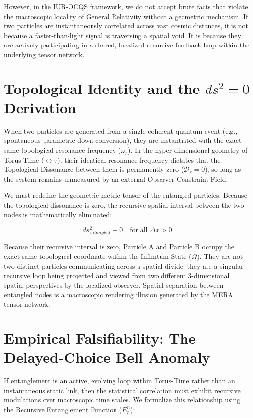 \documentclass[12pt,openany]{book}
\begin{document}
However, in the IUR-OCQS framework, we do not accept brute facts that violate the macroscopic locality of General Relativity without a geometric mechanism. If two particles are instantaneously correlated across vast cosmic distances, it is not because a faster-than-light signal is traversing a spatial void. It is because they are actively participating in a shared, localized recursive feedback loop within the underlying tensor network.

\section{Topological Identity and the $ds^2 = 0$ Derivation}
When two particles are generated from a single coherent quantum event (e.g., spontaneous parametric down-conversion), they are instantiated with the exact same topological resonance frequency ($\omega_r$). In the hyper-dimensional geometry of Torus-Time ($\leftrightarrow\tau$), their identical resonance frequency dictates that the Topological Dissonance between them is permanently zero ($\mathcal{D}_r = 0$), so long as the system remains unmeasured by an external Observer Constraint Field.

We must redefine the geometric metric tensor of the entangled particles. Because the topological dissonance is zero, the recursive spatial interval between the two nodes is mathematically eliminated:

\begin{equation}
ds_{entangled}^2 \equiv 0 \quad \text{for all } \Delta x > 0
\end{equation}

Because their recursive interval is zero, Particle A and Particle B occupy the exact same topological coordinate within the Infinitum State ($\Omega$). They are not two distinct particles communicating across a spatial divide; they are a singular recursive loop being projected and viewed from two different 3-dimensional spatial perspectives by the localized observer. Spatial separation between entangled nodes is a macroscopic rendering illusion generated by the MERA tensor network.

\section{Empirical Falsifiability: The Delayed-Choice Bell Anomaly}
If entanglement is an active, evolving loop within Torus-Time rather than an instantaneous static link, then the statistical correlation must exhibit recursive modulations over macroscopic time scales. We formalize this relationship using the Recursive Entanglement Function ($E_r^n$):
\end{document}
